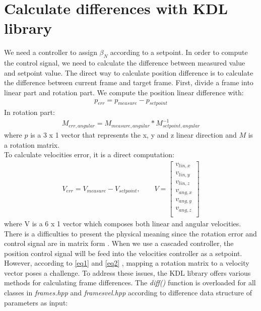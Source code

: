 \documentclass[report.tex]{subfiles}
\begin{document}
    \section{Calculate differences with KDL library}
    We need a controller to assign $\beta_N$ according to a setpoint. In order to compute the control signal, we need to calculate the difference between measured value and setpoint value. The direct way to calculate position difference is to calculate the difference between current frame and target frame. First, divide a frame into linear part and rotation part. We compute the position linear difference with:
    \begin{align}
        p_{err} = p_{measure}-p_{setpoint}
    \end{align}
    In rotation part:
    \begin{align}
        M_{err,angular} = M_{measure,angular}*M_{setpoint,angular}^{-1}
        \label{eq1}
    \end{align}
    where $p$ is a 3 x 1 vector that represents the x, y and z linear direction and $M$ is a rotation matrix. \\
    To calculate velocities error, it is a direct computation:
    \begin{align}
        V_{err} = V_{measure}-V_{setpoint} ,\qquad V = \begin{bmatrix}
            v_{lin,x}\\
            v_{lin,y}\\
            v_{lin,z}\\
            v_{ang,x}\\
            v_{ang,y}\\
            v_{ang,z}\\ 
        \end{bmatrix} 
        \label{eq2}
    \end{align}
    where V is a 6 x 1 vector which composes both linear and angular velocities.\\
    There is a difficulties to present the physical meaning since the rotation error and control signal are in matrix form . When we use a cascaded controller, the position control signal will be feed into the velocities controller as a setpoint. However, according to \ref{eq1} and \ref{eq2} , mapping a rotation matrix to a velocity vector poses a challenge. To address these issues, the KDL library offers various methods for calculating frame differences. The \textit{diff()} function is overloaded for all classes in \textit{frames.hpp} and \textit{framesvel.hpp} according to difference data structure of parameters as input:
\end{document}
